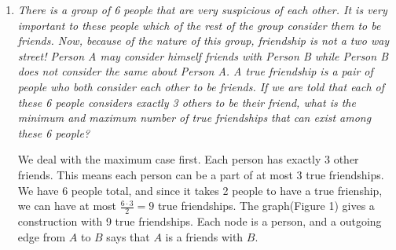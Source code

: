 \documentclass{article}
\begin{document}
\begin{enumerate}[1.]
\item %
{\itshape There is a group of 6 people that are very suspicious of each other. It is very important to these people which of the rest of the group consider them to be friends. Now, because of the nature of this group, friendship is not a two way street! Person A may consider himself friends with Person B while Person B does not consider the same about Person A. A true friendship is a pair of people who both consider each other to be friends. If we are told that each of these 6 people considers exactly 3 others to be their friend, what is the minimum and maximum number of true friendships that can exist among these 6 people?}

We deal with the maximum case first. Each person has exactly 3 other friends. This means each person can be a part of at most 3 true friendships. We have 6 people total, and since it takes 2 people to have a true frienship, we can have at most $\frac{6\cdot3}{2} = 9$ true friendships. The graph(Figure 1) gives a construction with 9 true friendships. Each node is a person, and a outgoing edge from $A$ to $B$ says that $A$ is a friends with $B$.


\end{enumerate}
\end{document}
